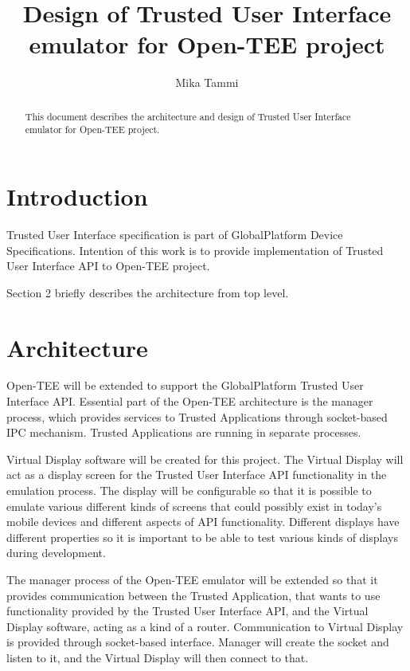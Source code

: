 \documentclass{article}
\begin{document}
\title{Design of Trusted User Interface emulator for Open-TEE project}
\author{Mika Tammi}

\maketitle

\begin{abstract}
This document describes the architecture and design of Trusted User Interface
emulator for Open-TEE project.
\end{abstract}

\section{Introduction}

Trusted User Interface specification is part of GlobalPlatform Device
Specifications. Intention of this work is to provide implementation of Trusted
User Interface API to Open-TEE project.

Section 2 briefly describes the architecture from top level.

\section{Architecture}

Open-TEE will be extended to support the GlobalPlatform Trusted User Interface
API. Essential part of the Open-TEE architecture is the manager process, which
provides services to Trusted Applications through socket-based IPC mechanism.
Trusted Applications are running in separate processes.

Virtual Display software will be created for this project. The Virtual Display
will act as a display screen for the Trusted User Interface API functionality
in the emulation process. The display will be configurable so that it is
possible to emulate various different kinds of screens that could possibly
exist in today's mobile devices and different aspects of API functionality.
Different displays have different properties so it is important to be able to
test various kinds of displays during development.



The manager process of the Open-TEE emulator will be extended so that it
provides communication between the Trusted Application, that wants to use
functionality provided by the Trusted User Interface API, and the Virtual
Display software, acting as a kind of a router. Communication to Virtual
Display is provided through socket-based interface. Manager will create the
socket and listen to it, and the Virtual Display will then connect to that.
\end{document}
